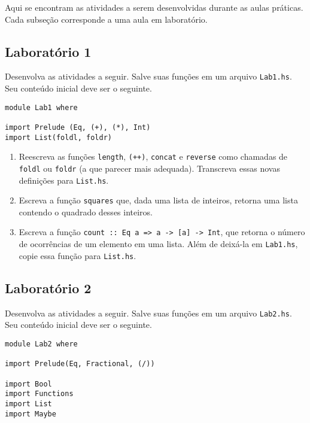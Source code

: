 \documentclass[a4paper]{article}
\begin{document}
Aqui se encontram as atividades a serem desenvolvidas durante as aulas práticas.
Cada subseção corresponde a uma aula em laboratório.

\subsection{Laboratório 1}

Desenvolva as atividades a seguir.
Salve suas funções em um arquivo \texttt{Lab1.hs}.
Seu conteúdo inicial deve ser o seguinte.

\begin{verbatim}
module Lab1 where

import Prelude (Eq, (+), (*), Int)
import List(foldl, foldr)
\end{verbatim}

\begin{enumerate}
	\item
		Reescreva as funções \texttt{length}, \texttt{(++)}, \texttt{concat} e \texttt{reverse} como chamadas de \texttt{foldl} ou \texttt{foldr} (a que parecer mais adequada).
		Transcreva essas novas definições para \texttt{List.hs}.
	\item
		Escreva a função \texttt{squares} que, dada uma lista de inteiros, retorna uma lista contendo o quadrado desses inteiros.
	\item
		Escreva a função \texttt{count :: Eq a => a -> [a] -> Int}, que retorna o número de ocorrências de um elemento em uma lista.
		Além de deixá-la em \texttt{Lab1.hs}, copie essa função para \texttt{List.hs}.
\end{enumerate}

\subsection{Laboratório 2} \label{lab2}

Desenvolva as atividades a seguir.
Salve suas funções em um arquivo \texttt{Lab2.hs}.
Seu conteúdo inicial deve ser o seguinte.

\begin{verbatim}
module Lab2 where

import Prelude(Eq, Fractional, (/))

import Bool
import Functions
import List
import Maybe
\end{verbatim}
\end{document}

